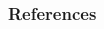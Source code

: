 \documentclass{beamer}
\begin{document}
\begin{frame} 
	\frametitle{References} 
	
	\begin{thebibliography}{lskdjf}
	
	
  
  	\end{thebibliography}

\end{frame} 
\end{document}
